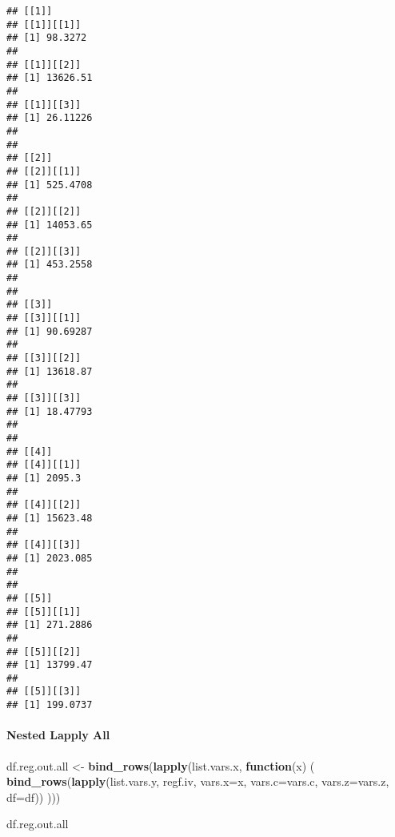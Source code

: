 \documentclass[
]{book}
\newenvironment{Shaded}{\begin{snugshade}}{\end{snugshade}}
\newcommand{\ControlFlowTok}[1]{\textcolor[rgb]{0.13,0.29,0.53}{\textbf{#1}}}
\newcommand{\DataTypeTok}[1]{\textcolor[rgb]{0.13,0.29,0.53}{#1}}
\newcommand{\KeywordTok}[1]{\textcolor[rgb]{0.13,0.29,0.53}{\textbf{#1}}}
\newcommand{\NormalTok}[1]{#1}
\newcommand{\StringTok}[1]{\textcolor[rgb]{0.31,0.60,0.02}{#1}}
\begin{document}
\begin{verbatim}
## [[1]]
## [[1]][[1]]
## [1] 98.3272
## 
## [[1]][[2]]
## [1] 13626.51
## 
## [[1]][[3]]
## [1] 26.11226
## 
## 
## [[2]]
## [[2]][[1]]
## [1] 525.4708
## 
## [[2]][[2]]
## [1] 14053.65
## 
## [[2]][[3]]
## [1] 453.2558
## 
## 
## [[3]]
## [[3]][[1]]
## [1] 90.69287
## 
## [[3]][[2]]
## [1] 13618.87
## 
## [[3]][[3]]
## [1] 18.47793
## 
## 
## [[4]]
## [[4]][[1]]
## [1] 2095.3
## 
## [[4]][[2]]
## [1] 15623.48
## 
## [[4]][[3]]
## [1] 2023.085
## 
## 
## [[5]]
## [[5]][[1]]
## [1] 271.2886
## 
## [[5]][[2]]
## [1] 13799.47
## 
## [[5]][[3]]
## [1] 199.0737
\end{verbatim}

\hypertarget{nested-lapply-all}{%
\paragraph{Nested Lapply All}\label{nested-lapply-all}}

\begin{Shaded}
\begin{Highlighting}[]
\NormalTok{df.reg.out.all <-}\StringTok{ }\KeywordTok{bind_rows}\NormalTok{(}\KeywordTok{lapply}\NormalTok{(list.vars.x,}
                      \ControlFlowTok{function}\NormalTok{(x) (}
                          \KeywordTok{bind_rows}\NormalTok{(}\KeywordTok{lapply}\NormalTok{(list.vars.y, regf.iv, }\DataTypeTok{vars.x=}\NormalTok{x, }\DataTypeTok{vars.c=}\NormalTok{vars.c, }\DataTypeTok{vars.z=}\NormalTok{vars.z, }\DataTypeTok{df=}\NormalTok{df))}
\NormalTok{                      )))}
\end{Highlighting}
\end{Shaded}

\begin{Shaded}
\begin{Highlighting}[]
\NormalTok{df.reg.out.all}
\end{Highlighting}
\end{Shaded}
\end{document}
